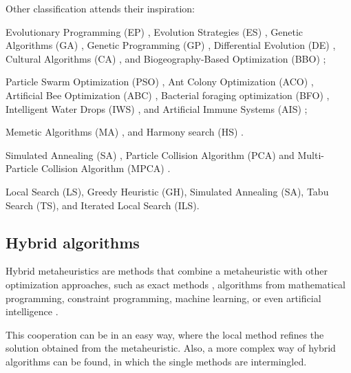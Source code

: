 Other classification attends their inspiration:

\begin{description}[style=sameline]
    \item[Evolution] Evolutionary Programming (EP) \cite{Fogel:1999:ITS:317034}, Evolution Strategies (ES) \cite{beyer2013theory}, Genetic Algorithms (GA) \cite{Holland:1992:ANA:129194}, Genetic Programming (GP) \cite{langdon:2010:GPEM}, Differential Evolution (DE) \cite{das2011differential}, Cultural Algorithms (CA) \cite{reynolds1994introduction}, and Biogeography-Based Optimization (BBO) \cite{simon2008biogeography};
    \item[Swarm intelligence] Particle Swarm Optimization (PSO) \cite{eberhart1995new,kennedy2010particle}, Ant Colony Optimization (ACO) \cite{dorigo2010ant,dorigo2006ant}, Artificial Bee Optimization (ABC) \cite{karaboga2007powerful}, Bacterial foraging optimization (BFO) \cite{das2009bacterial}, Intelligent Water Drops (IWS) \cite{shah2009intelligent}, and Artificial Immune Systems (AIS) \cite{de2002artificial};
    \item[Human-based] Memetic Algorithms (MA) \cite{Moscato89onevolution}, and Harmony search (HS) \cite{geem2001new}.
    \item[Sciences-based] Simulated Annealing (SA) \cite{kirkpatrick1983optimization}, Particle Collision Algorithm (PCA) \cite{sacco2005new} and Multi-Particle Collision Algorithm (MPCA) \cite{da2008new}.
    \item[Not inspired in nature] Local Search (LS), Greedy Heuristic (GH), Simulated Annealing (SA), Tabu Search (TS), and Iterated Local Search (ILS).
\end{description}

\subsection{Hybrid algorithms}

Hybrid metaheuristics are methods that combine a metaheuristic with other optimization approaches, such as exact methods \cite{jourdan2009hybridizing}, algorithms from mathematical programming, constraint programming, machine learning, or even artificial intelligence \cite{raidl2006unified, raidl2010metaheuristic}.

This cooperation can be in an easy way, where the local method refines the solution obtained from the metaheuristic. Also, a more complex way of hybrid algorithms can be found, in which the single methods are intermingled.

